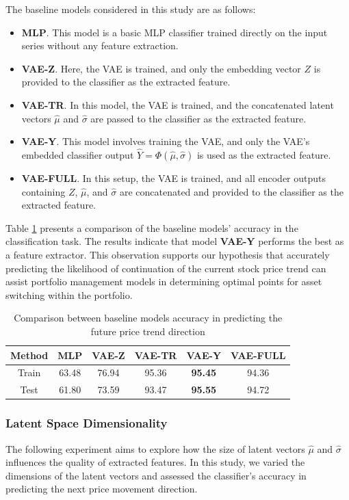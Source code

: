 The baseline models considered in this study are as follows:
\begin{itemize}
	\item \textbf{MLP}. This model is a basic MLP classifier trained directly on the input series without any feature extraction.
	\item \textbf{VAE-Z}. Here, the VAE is trained, and only the embedding vector $Z$ is provided to the classifier as the extracted feature.
	\item \textbf{VAE-TR}. In this model, the VAE is trained, and the concatenated latent vectors $\hat{\mu}$ and $\hat{\sigma}$ are passed to the classifier as the extracted feature.
	\item \textbf{VAE-Y}. This model involves training the VAE, and only the VAE's embedded classifier output $\hat{Y} = \Phi(\hat{\mu}, \hat{\sigma})$ is used as the extracted feature.
	\item \textbf{VAE-FULL}. In this setup, the VAE is trained, and all encoder outputs containing $Z$, $\hat{\mu}$, and $\hat{\sigma}$ are concatenated and provided to the classifier as the extracted feature.
\end{itemize}

Table \ref{tbl:FE-pred} presents a comparison of the baseline models' accuracy in the classification task. The results indicate that model \textbf{VAE-Y} performs the best as a feature extractor. This observation supports our hypothesis that accurately predicting the likelihood of continuation of the current stock price trend can assist portfolio management models in determining optimal points for asset switching within the portfolio.

\begin{table}[h]
	\centering
	\caption{Comparison between baseline models accuracy in predicting the future price trend direction}
	\label{tbl:FE-pred}
	\begin{tabular}{c | c | c | c | c | c }
		Method & MLP & VAE-Z & VAE-TR & VAE-Y & VAE-FULL \\
		\hline
		\hline
		Train & 63.48& 76.94 & 95.36 & \textbf{95.45} & 94.36\\
		Test & 61.80& 73.59 & 93.47 & \textbf{95.55} & 94.72\\
	\end{tabular}
\end{table}

\subsubsection{Latent Space Dimensionality}
The following experiment aims to explore how the size of latent vectors $\hat{\mu}$ and $\hat{\sigma}$ influences the quality of extracted features. In this study, we varied the dimensions of the latent vectors and assessed the classifier's accuracy in predicting the next price movement direction.

